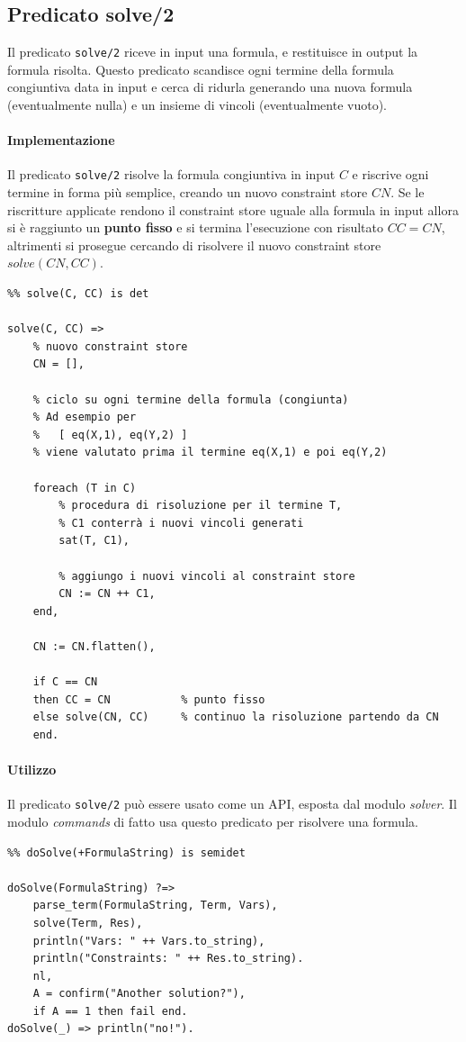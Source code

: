 \documentclass[12pt,a4paper,openright]{book}  %
\begin{document}
\subsection{Predicato solve/2}
\label{subsec:lsetpicat_solver_solve2}

Il predicato \verb|solve/2| riceve in input una formula, e restituisce
in output la formula risolta. Questo predicato scandisce ogni termine
della formula congiuntiva data in input e cerca di ridurla generando
una nuova formula (eventualmente nulla) e un insieme di vincoli
(eventualmente vuoto).

\paragraph{Implementazione}

Il predicato \verb|solve/2| risolve la formula congiuntiva in input
$C$ e riscrive ogni termine in forma più semplice, creando un nuovo
constraint store $CN$. Se le riscritture applicate rendono il
constraint store uguale alla formula in input allora si è raggiunto un
\textbf{punto fisso} e si termina l'esecuzione con risultato $CC =
CN$, altrimenti si prosegue cercando di risolvere il nuovo constraint
store $solve(CN, CC)$.

\begin{verbatim}
%% solve(C, CC) is det

solve(C, CC) =>
    % nuovo constraint store
    CN = [],
    
    % ciclo su ogni termine della formula (congiunta)
    % Ad esempio per
    %   [ eq(X,1), eq(Y,2) ]
    % viene valutato prima il termine eq(X,1) e poi eq(Y,2)

    foreach (T in C)
        % procedura di risoluzione per il termine T,
        % C1 conterrà i nuovi vincoli generati
        sat(T, C1),

        % aggiungo i nuovi vincoli al constraint store
        CN := CN ++ C1,
    end,
    
    CN := CN.flatten(),

    if C == CN
    then CC = CN           % punto fisso
    else solve(CN, CC)     % continuo la risoluzione partendo da CN
    end.
\end{verbatim}

\paragraph{Utilizzo}
Il predicato \verb|solve/2| può essere usato come un API, esposta dal
modulo \emph{solver}. Il modulo \emph{commands} di fatto usa questo
predicato per risolvere una formula.
\begin{verbatim}
%% doSolve(+FormulaString) is semidet

doSolve(FormulaString) ?=>
    parse_term(FormulaString, Term, Vars),
    solve(Term, Res),
    println("Vars: " ++ Vars.to_string),
    println("Constraints: " ++ Res.to_string).
    nl,
    A = confirm("Another solution?"),
    if A == 1 then fail end.
doSolve(_) => println("no!").
\end{verbatim}
\end{document}
